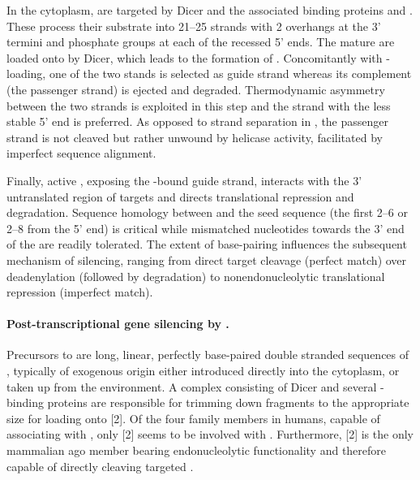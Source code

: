 In the cytoplasm,  are targeted by Dicer and the associated  binding proteins  and . These process their substrate into 21--\SI{25}{\nucleotide}  strands with \SI{2}{\nucleotide} overhangs at the 3' termini and phosphate groups at each of the recessed 5' ends. The mature  are loaded onto  by Dicer, which leads to the formation of . Concomitantly with -loading, one of the two  stands is selected as guide strand whereas its complement (the passenger strand) is ejected and degraded. Thermodynamic asymmetry between the two strands is exploited in this step and the strand with the less stable 5' end is preferred. As opposed to strand separation in , the passenger strand is not cleaved but rather unwound by helicase activity, facilitated by imperfect sequence alignment.

Finally, active , exposing the -bound guide strand, interacts with the 3' untranslated region of  targets and directs translational repression and  degradation. Sequence homology between  and the  seed sequence (the first 2--6 or 2--\SI{8}{\nucleotide} from the 5' end) is critical while mismatched nucleotides towards the 3' end of the  are readily tolerated. The extent of base-pairing influences the subsequent mechanism of silencing, ranging from direct target cleavage (perfect match) over deadenylation (followed by degradation) to nonendonucleolytic translational repression (imperfect match).

\paragraph{Post-transcriptional gene silencing by .}
Precursors to  are long, linear, perfectly base-paired double stranded sequences of , typically of exogenous origin either introduced directly into the cytoplasm, or taken up from the environment. A complex consisting of Dicer and several -binding proteins are responsible for trimming down  fragments to the appropriate size for loading onto [2]. Of the four  family members in humans, capable of associating with , only [2] seems to be involved with . Furthermore, [2] is the only mammalian \acrlong{ago} member bearing endonucleolytic functionality and therefore capable of directly cleaving targeted .

